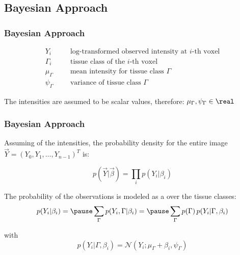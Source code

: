 \subsection{Bayesian Approach}

\begin{frame}
  \frametitle{Bayesian Approach}


  \begin{eqnarray*}
    Y_i         &\phantom{=}& \mbox{log-transformed observed intensity at $i$-th voxel} \\
    \Gamma_i    &\phantom{=}& \mbox{tissue class of the $i$-th voxel} \\
    \mu_\Gamma  &\phantom{=}& \mbox{mean intensity for tissue class $\Gamma$} \\
    \psi_\Gamma &\phantom{=}& \mbox{variance of tissue class $\Gamma$}
  \end{eqnarray*}

  The intensities are assumed to be scalar values, therefore: $\mu_\Gamma, \psi_\Gamma \in \real$ 
\end{frame}


\begin{frame}
  \frametitle{Bayesian Approach \cont}

  Assuming  of the intensities, the probability density for the entire image $\vec Y = \left(Y_0, Y_1, \ldots, Y_{n-1} \right)^T$ is: \pause
  
  \begin{displaymath}
    p(\vec Y | \vec \beta) = \prod_i p(Y_i | \beta_i)
  \end{displaymath}
  \pause 
  
  The probability of the observations is modeled as a  over the tissue classes:
  \begin{displaymath}
    p(Y_i | \beta_i) = \pause \sum_{\Gamma} p(Y_i, \Gamma | \beta_i) = \pause 
    \sum_{\Gamma} p(\Gamma) \, p(Y_i | \Gamma, \beta_i) 
  \end{displaymath}
  \pause 
  
  with 
  \begin{displaymath}
    p(Y_i | \Gamma, \beta_i) = {\mathcal N}(Y_i ; \mu_\Gamma + \beta_i, \psi_{\Gamma})
  \end{displaymath}
\end{frame}


